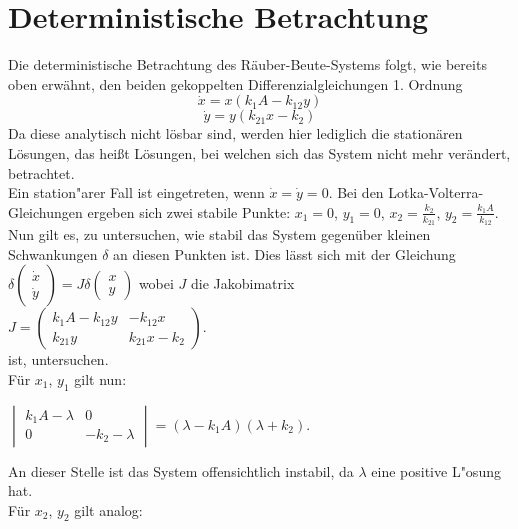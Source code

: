 \documentclass[11pt]{article}
\begin{document}
\section{Deterministische Betrachtung}
Die deterministische Betrachtung des Räuber-Beute-Systems folgt, wie bereits oben erwähnt, den beiden gekoppelten Differenzialgleichungen 1. Ordnung
$$\dot x=x(k_1 A-k_{12}y)$$
$$\dot y=y(k_{21}x-k_2)$$
Da diese analytisch nicht lösbar sind, werden hier lediglich die stationären Lösungen, das heißt Lösungen, bei welchen sich das System nicht mehr verändert, betrachtet.\\
Ein station"arer Fall ist eingetreten, wenn  $\dot x=\dot y=0$. Bei den Lotka-Volterra-Gleichungen ergeben sich zwei stabile Punkte: 
 $x_1=0$, $y_1=0$, $x_2=\frac{k_2}{k_{21}}$, $y_2=\frac{k_1 A}{k_{12}}$.\\
Nun gilt es, zu untersuchen, wie stabil das System gegenüber kleinen Schwankungen $\delta$ an diesen Punkten ist. Dies lässt sich mit der Gleichung
$\delta \begin{pmatrix} \dot x \\ \dot y \end{pmatrix}=J\delta \begin{pmatrix} x \\ y \end{pmatrix}$ wobei $J$ die Jakobimatrix\\
$J=\begin{pmatrix} k_1A-k_{12}y & -k_{12}x \\ k_{21}y & k_{21}x-k_2 \end{pmatrix}$.\vspace{3mm} \\
ist, untersuchen.\\
Für $x_1$, $y_1$ gilt nun:\\
\vspace{3mm}

$\begin{vmatrix} k_1 A -\lambda & 0 \\ 0 & -k_2-\lambda \end{vmatrix}=(\lambda-k_1A)(\lambda+k_2)$.\\
\vspace{3mm}

An dieser Stelle ist das System offensichtlich instabil, da $\lambda$ eine positive L"osung hat.\\
Für $x_2$, $y_2$ gilt analog:\\
\vspace{3mm}
\end{document}
